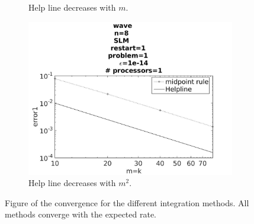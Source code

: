 \begin{figure}[H]
\begin{subfigure}[b]{0.30\textwidth}
                \caption{ Help line decreases with $m$. }
                \label{fig:intconveul}
        \end{subfigure}
        \begin{subfigure}[b]{0.30\textwidth}
                \includegraphics[width=\textwidth]{../MATLAB/fig/intconvmid.jpg}
                \caption{ Help line decreases with $m^2$. }
                \label{fig:intconvmid}
        \end{subfigure}
        
        
        \caption{Figure of the convergence for the different integration methods. All methods converge with the expected rate. }
        \label{fig:intconv}
\end{figure}


